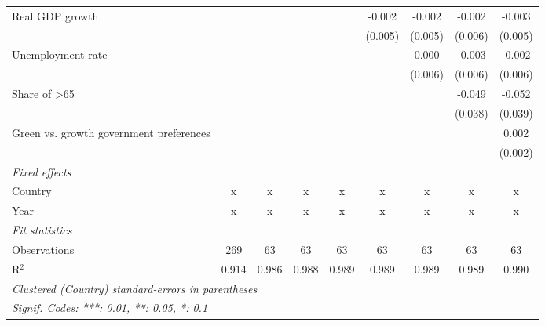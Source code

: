 \begin{table}[htbp]
\begin{tabular}{lcccccccc}
      Real GDP growth                                                  &              &         &             &               & -0.002        & -0.002        & -0.002        & -0.003\\   
                                                                       &              &         &             &               & (0.005)       & (0.005)       & (0.006)       & (0.005)\\   
      Unemployment rate                                                &              &         &             &               &               & 0.000         & -0.003        & -0.002\\   
                                                                       &              &         &             &               &               & (0.006)       & (0.006)       & (0.006)\\   
      Share of >65                                                     &              &         &             &               &               &               & -0.049        & -0.052\\   
                                                                       &              &         &             &               &               &               & (0.038)       & (0.039)\\   
      Green vs. growth government preferences                          &              &         &             &               &               &               &               & 0.002\\   
                                                                       &              &         &             &               &               &               &               & (0.002)\\   
      \emph{Fixed effects}\\
      Country                                                          & x            & x       & x           & x             & x             & x             & x             & x\\  
      Year                                                             & x            & x       & x           & x             & x             & x             & x             & x\\  
      \midrule \emph{Fit statistics}\\
      Observations                                                     & 269          & 63      & 63          & 63            & 63            & 63            & 63            & 63\\  
      R$^2$                                                            & 0.914        & 0.986   & 0.988       & 0.989         & 0.989         & 0.989         & 0.989         & 0.990\\  
      \midrule
      \multicolumn{9}{l}{\emph{Clustered (Country) standard-errors in parentheses}}\\
      \multicolumn{9}{l}{\emph{Signif. Codes: ***: 0.01, **: 0.05, *: 0.1}}\\
   \end{tabular}
\end{table}


